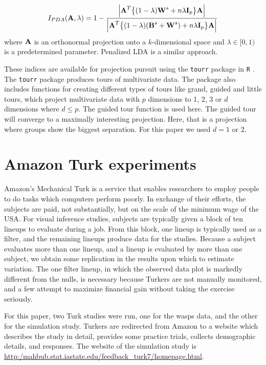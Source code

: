 \begin{eqnarray}
I_{PDA}(\mbox{\boldmath {\bf A}},\lambda) =
1-\frac{\Big|\mbox{\boldmath {\bf A}}^T\big\{(1-\lambda)\mbox{\boldmath {\bf W}}^s+n\lambda\mbox{\boldmath {\bf I}}_p\big\}
\mbox{\boldmath {\bf A}}\Big|}
              {\Big|\mbox{\boldmath {\bf A}}^T\big\{(1-\lambda)(\mbox{\boldmath {\bf B}}^s +\mbox{\boldmath {\bf W}}^s)+n\lambda\mbox{\boldmath {\bf I}}_p\big\} \mbox{\boldmath {\bf A}}\Big|}\label{PDA3}
\end{eqnarray}
where $\mbox{\boldmath {\bf A}}$ is an orthonormal projection onto a $k$-dimensional space
and $\lambda \in [0,1)$ is a predetermined parameter. Penalized LDA \citep{witten:2011} is a similar approach.

These indices are available for projection pursuit using the \texttt{tourr} package \citep{tourr:2011} in \texttt{R} \citep{r}. The \texttt{tourr} package produces tours of multivariate data. The package also includes functions for creating different types of tours like grand, guided and little tours, which project multivariate data with $p$ dimensions to 1, 2, 3 or $d$ dimensions where $d \le p$. The guided tour function is used here. The guided tour will converge to a maximally interesting projection. Here, that is a projection where groups show the biggest separation. For this paper we used $d = 1$ or 2.  

\section{Amazon Turk experiments} \label{sec:turk}

Amazon's Mechanical Turk \citep{turk} is a service that enables researchers to employ people to do tasks which computers perform poorly. In exchange of their efforts, the subjects are paid, not substantially, but on the scale of the minimum wage of the USA. For visual inference studies, subjects are typically given a block of ten lineups to evaluate during a job. From this block, one lineup is typically used as a filter, and the remaining lineups produce data for the studies. Because a subject evaluates more than one lineup, and a lineup is evaluated by more than one subject, we obtain some replication in the results upon which to estimate variation. The one filter lineup, in which the observed data plot is markedly different from the nulls, is necessary because Turkers are not manually monitored, and a few attempt to maximize financial gain without taking the exercise seriously. 

For this paper, two Turk studies were run, one for the wasps data, and the other for the simulation study. Turkers are redirected from Amazon to a website which describes the study in detail, provides some practice trials, collects demographic details, and responses. The website of the simulation study is \url{http:/mahbub.stat.iastate.edu/feedback_turk7/homepage.html}.


